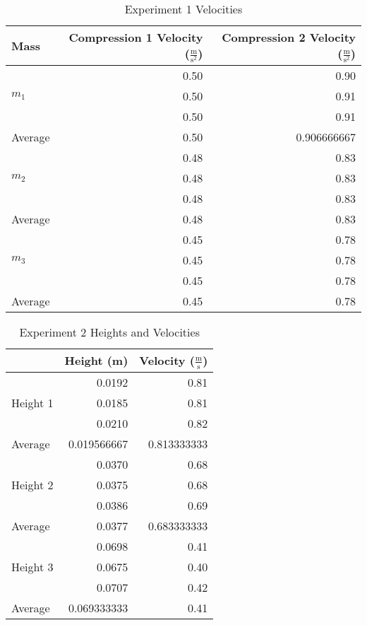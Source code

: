 \documentclass [12pt, letterpaper, twoside] {article}
\begin{document}
\begin {table}[h]
  \centering
    \begin {tabular} {| l | r | r |}
      \hline\hline
      Mass & Compression 1 Velocity (\(\tfrac{\text{m}}{\text{s}^2}\)) & Compression 2 Velocity (\(\tfrac{\text{m}}{\text{s}^2}\)) \\
      \hline
      \multirow{3}{*}{\(m_{1}\)} & 0.50 & 0.90 \\
      & 0.50 & 0.91 \\
      & 0.50 & 0.91 \\
      \hline
      Average & 0.50 & 0.906666667 \\
      \hline
      \multirow{3}{*}{\(m_{2}\)} & 0.48 & 0.83 \\
      & 0.48 & 0.83 \\
      & 0.48 & 0.83 \\
      \hline
      Average & 0.48 & 0.83 \\
      \hline
      \multirow{3}{*}{\(m_{3}\)} & 0.45 & 0.78 \\
      & 0.45 & 0.78 \\
      & 0.45 & 0.78 \\
      \hline
      Average & 0.45 & 0.78 \\
      \hline\hline
    \end {tabular}
  \caption {Experiment 1 Velocities}
\end {table}
      
\begin {table}[h]
  \centering
  \begin {tabular} {| l | r | r |}
    \hline\hline
    & Height (m) & Velocity (\(\tfrac{\text{m}}{\text{s}}\)) \\
    \hline
    \multirow{3}{*}{Height 1} & 0.0192 & 0.81 \\
    & 0.0185 & 0.81 \\
    & 0.0210 & 0.82 \\
    \hline
    Average & 0.019566667 & 0.813333333 \\
    \hline
    \multirow{3}{*}{Height 2} & 0.0370 & 0.68 \\
    & 0.0375 & 0.68 \\
    & 0.0386 & 0.69 \\
    \hline
    Average & 0.0377 & 0.683333333 \\
    \hline
    \multirow{3}{*}{Height 3} & 0.0698 & 0.41 \\
    & 0.0675 & 0.40 \\
    & 0.0707 & 0.42 \\
    \hline
    Average & 0.069333333 & 0.41 \\
    \hline\hline
  \end {tabular}
  \caption {Experiment 2 Heights and Velocities}
\end {table}
\end{document}
